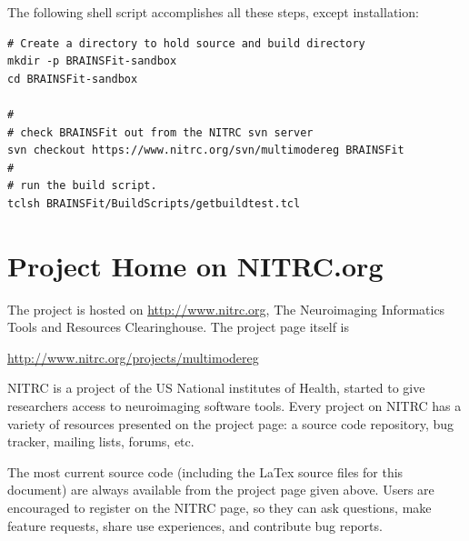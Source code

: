 \documentclass{InsightArticle}
\begin{document}
The following shell script accomplishes all these steps, except installation:
\begin{verbatim}
# Create a directory to hold source and build directory
mkdir -p BRAINSFit-sandbox
cd BRAINSFit-sandbox

#
# check BRAINSFit out from the NITRC svn server 
svn checkout https://www.nitrc.org/svn/multimodereg BRAINSFit
#
# run the build script.
tclsh BRAINSFit/BuildScripts/getbuildtest.tcl

\end{verbatim}

\section{Project Home on NITRC.org}
The \miregprog{} project is hosted on \url{http://www.nitrc.org}, The Neuroimaging Informatics Tools and Resources Clearinghouse.  The project page itself is 

\url{http://www.nitrc.org/projects/multimodereg}

NITRC is a project of the US National institutes of Health, started to give researchers access to neuroimaging software tools.  Every project on NITRC has a variety of resources presented on the project page: a source code repository, bug tracker, mailing lists, forums, etc.

The most current source code (including the LaTex source files for this document) are always available from the project page given above.  Users are encouraged to register on the NITRC page, so they can ask questions, make feature requests, share use experiences, and contribute bug reports.
\appendix

%
%



\end{document}
